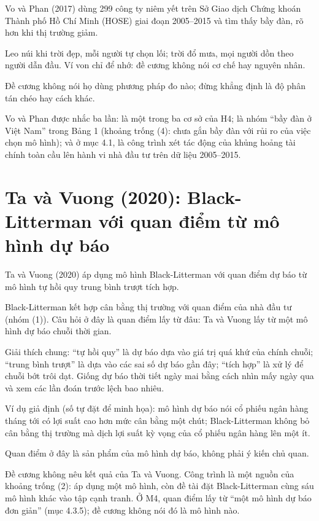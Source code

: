 Vo và Phan (2017) dùng 299 công ty niêm yết trên Sở Giao dịch Chứng khoán Thành phố Hồ Chí Minh (HOSE) giai đoạn 2005--2015 và tìm thấy bầy đàn, rõ hơn khi thị trường giảm.

Leo núi khi trời đẹp, mỗi người tự chọn lối; trời đổ mưa, mọi người dồn theo người dẫn đầu. Ví von chỉ để nhớ: đề cương không nói cơ chế hay nguyên nhân.

Đề cương không nói họ dùng phương pháp đo nào; đừng khẳng định là độ phân tán chéo hay cách khác.

Vo và Phan được nhắc ba lần: là một trong ba cơ sở của H4; là nhóm “bầy đàn ở Việt Nam” trong Bảng 1 (khoảng trống (4): chưa gắn bầy đàn với rủi ro của việc chọn mô hình); và ở mục 4.1, là công trình xét tác động của khủng hoảng tài chính toàn cầu lên hành vi nhà đầu tư trên dữ liệu 2005--2015.

\section{Ta và Vuong (2020): Black-Litterman với quan điểm từ mô hình dự báo}

Ta và Vuong (2020) áp dụng mô hình Black-Litterman với quan điểm dự báo từ mô hình tự hồi quy trung bình trượt tích hợp.

Black-Litterman kết hợp cân bằng thị trường với quan điểm của nhà đầu tư (nhóm (1)). Câu hỏi ở đây là quan điểm lấy từ đâu: Ta và Vuong lấy từ một mô hình dự báo chuỗi thời gian.

Giải thích chung: “tự hồi quy” là dự báo dựa vào giá trị quá khứ của chính chuỗi; “trung bình trượt” là dựa vào các sai số dự báo gần đây; “tích hợp” là xử lý để chuỗi bớt trôi dạt. Giống dự báo thời tiết ngày mai bằng cách nhìn mấy ngày qua và xem các lần đoán trước lệch bao nhiêu.

\begin{tcolorbox}[breakable]
Ví dụ giả định (số tự đặt để minh họa): mô hình dự báo nói cổ phiếu ngân hàng tháng tới có lợi suất cao hơn mức cân bằng một chút; Black-Litterman không bỏ cân bằng thị trường mà dịch lợi suất kỳ vọng của cổ phiếu ngân hàng lên một ít.

Quan điểm ở đây là sản phẩm của mô hình dự báo, không phải ý kiến chủ quan.
\end{tcolorbox}

Đề cương không nêu kết quả của Ta và Vuong. Công trình là một nguồn của khoảng trống (2): áp dụng một mô hình, còn đề tài đặt Black-Litterman cùng sáu mô hình khác vào tập cạnh tranh. Ở M4, quan điểm lấy từ “một mô hình dự báo đơn giản” (mục 4.3.5); đề cương không nói đó là mô hình nào.

